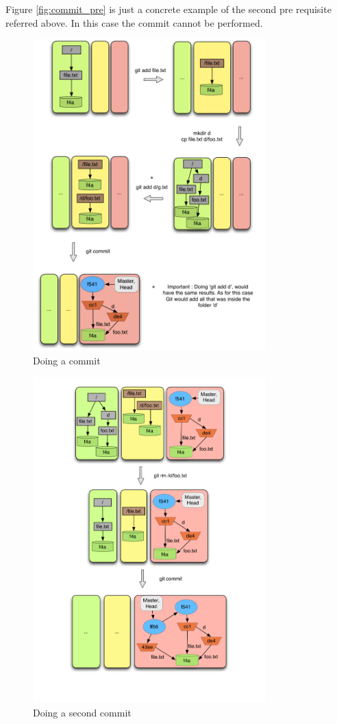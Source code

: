 Figure \ref{fig:commit_pre} is just a concrete example of the second pre requisite
referred above. In this case the commit cannot be performed.\\

\begin{figure}[hp]
   \centering
   \includegraphics[width=0.8\textwidth]{images/commit1.png}
   \caption{Doing a commit}\label{fig:commit1}
\end{figure}
\begin{figure}[hp]
   \centering
   \includegraphics[width=0.8\textwidth]{images/commit2.png}
   \caption{Doing a second commit}\label{fig:commit2}
\end{figure}

